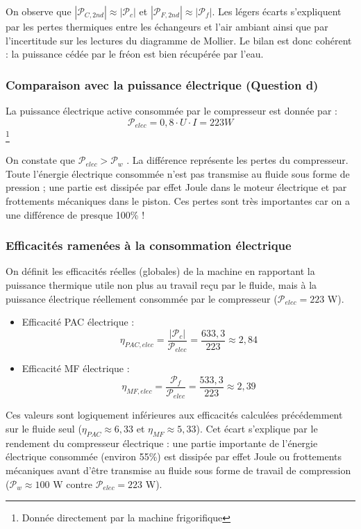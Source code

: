 \documentclass[a4paper,10pt,french]{scrartcl}
\begin{document}
On observe que $|\mathcal{P}_{C,2nd}| \approx |\mathcal{P}_c|$  et $|\mathcal{P}_{F,2nd}| \approx |\mathcal{P}_f|$. Les légers écarts s'expliquent par les pertes thermiques entre les échangeurs et l'air ambiant ainsi que par l'incertitude sur les lectures du diagramme de Mollier. Le bilan est donc cohérent : la puissance cédée par le fréon est bien récupérée par l'eau.

\subsubsection{Comparaison avec la puissance électrique (Question d)}

La puissance électrique active consommée par le compresseur est donnée par :
$$\mathcal{P}_{elec} = 0,8 \cdot U \cdot I = 223 W$$\footnote{Donnée directement par la machine frigorifique}

On constate que $\mathcal{P}_{elec} > \mathcal{P}_w$ . La différence représente les pertes du compresseur. Toute l'énergie électrique consommée n'est pas transmise au fluide sous forme de pression ; une partie est dissipée par effet Joule dans le moteur électrique et par frottements mécaniques dans le piston. Ces pertes sont très importantes car on a une différence de presque 100\% !

\subsubsection{Efficacités ramenées à la consommation électrique}

On définit les efficacités réelles (globales) de la machine en rapportant la puissance thermique utile non plus au travail reçu par le fluide, mais à la puissance électrique réellement consommée par le compresseur ($\mathcal{P}_{elec} = 223$ W).

\begin{itemize}
    \item {Efficacité PAC électrique :} 
    $$\eta_{PAC, elec} = \frac{|\mathcal{P}_c|}{\mathcal{P}_{elec}} = \frac{633,3}{223} \approx 2,84$$
    
    \item {Efficacité MF électrique :} 
    $$\eta_{MF, elec} = \frac{\mathcal{P}_f}{\mathcal{P}_{elec}} = \frac{533,3}{223} \approx 2,39$$
\end{itemize}

Ces valeurs sont logiquement inférieures aux efficacités calculées précédemment sur le fluide seul ($\eta_{PAC} \approx 6,33$ et $\eta_{MF} \approx 5,33$). Cet écart s'explique par le rendement du compresseur électrique : une partie importante de l'énergie électrique consommée (environ 55\%) est dissipée par effet Joule ou frottements mécaniques avant d'être transmise au fluide sous forme de travail de compression ($\mathcal{P}_w \approx 100$ W contre $\mathcal{P}_{elec} = 223$ W).
\end{document}
